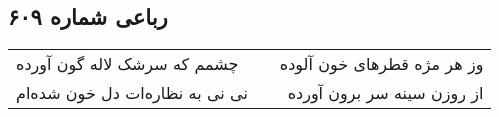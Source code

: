\begin{center}
\section*{رباعی شماره ۶۰۹}
\label{sec:sh609}
\begin{longtable}{l p{0.5cm} r}
چشمم که سرشک لاله گون آورده
&&
وز هر مژه قطرهای خون آلوده
\\
نی نی به نظاره‌ات دل خون شده‌ام
&&
از روزن سینه سر برون آورده
\\
\end{longtable}
\end{center}
